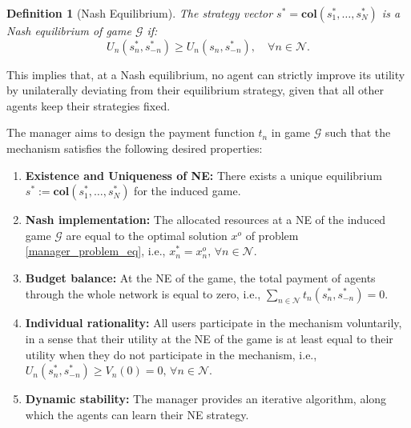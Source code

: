 \documentclass[twocolumn]{autart}
\newtheorem{definition}{Definition}
\begin{document}
\begin{definition}[Nash Equilibrium]\label{nash_def}
	The strategy vector $s^*=\textbf{col}(s_1^*, \ldots, s_N^*)$ is a Nash equilibrium of game $\mathcal{G}$ if:
	\[
		U_n(s_n^*, s_{-n}^*)\geq U_n(s_n, s_{-n}^*), \quad \forall n\in\mathcal{N}.
	\]
\end{definition}
This implies that, at a Nash equilibrium, no agent can strictly improve its utility by unilaterally deviating from their equilibrium strategy, given that all other agents keep their strategies fixed. 

The manager aims to design the payment function $t_n$ in game $\mathcal{G}$ such that the mechanism satisfies the following desired properties:
\begin{enumerate}[P1)]
	\item \textbf{Existence and Uniqueness of NE:} There exists a unique equilibrium $s^*:=\textbf{col}(s_1^*,\ldots,s_N^*)$ for the induced game.
	\item
	\textbf{Nash implementation:} The  allocated resources at a NE of the induced game $\mathcal{G}$ are equal to the optimal solution $x^o$ of problem \eqref{manager_problem_eq}, i.e., $x_n^*=x_n^o, \, \forall n\in\mathcal{N}$.
	\item
	\textbf{Budget balance:} At the NE of the game, the total payment of agents through the whole network is equal to zero, i.e., $\sum_{n\in\mathcal{N}}{t_n(s_n^*, s_{-n}^*)}=0$.
        \item
	\textbf{Individual rationality:} All users participate in the mechanism voluntarily, in a sense that their utility at the NE of the game is at least equal to their utility when they do not participate in the mechanism, i.e., $U_n(s_n^*,s_{-n}^*)\geq V_n(0)=0, \, \forall n\in\mathcal{N}$.
	\item
	\textbf{Dynamic stability:} The manager provides an iterative algorithm, along which the agents can learn their NE strategy.
\end{enumerate}
\end{document}
